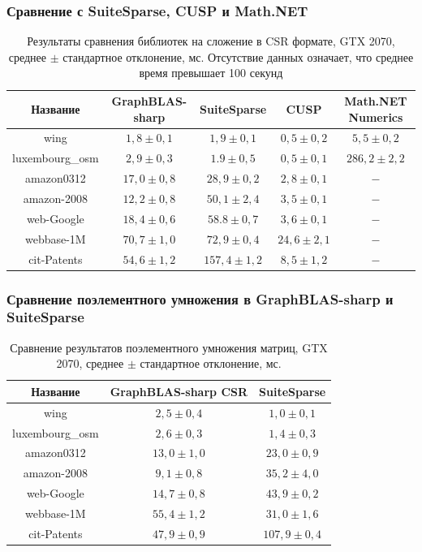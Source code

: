 \documentclass[aspectratio=169]{beamer}
\begin{document}
\begin{frame}
  \frametitle{Сравнение с SuiteSparse, CUSP и Math.NET}
\begin{table}
\centering
\begin{tabular}{|c||c|c|c|c|}
\hline
Название            & GraphBLAS-sharp & SuiteSparse & CUSP & Math.NET Numerics       \\
\hline
\hline
wing            & $1,8 \pm 0,1$      & $1,9\pm 0,1$   & $0,5\pm 0,2$ &  $5,5\pm 0,2$ \\
\hline
luxembourg\_osm & $2,9 \pm 0,3$      & $1.9\pm 0,5$   & $0,5\pm 0,1$  & $286,2\pm 2,2$ \\
\hline
amazon0312      & $17,0 \pm 0,8$      & $28,9\pm 0,2$  & $2,8\pm 0,1$  & $-$\\
\hline
amazon-2008     & $12,2 \pm 0,8$     & $50,1\pm 2,4$  & $3,5\pm 0,1$  & $-$\\
\hline
web-Google      & $18,4 \pm 0,6$     & $58.8\pm 0,7$  & $3,6\pm 0,1$  & $-$\\
\hline
webbase-1M      & $70,7 \pm 1,0$      & $72,9\pm 0,4$  & $24,6\pm 2,1$ & $-$\\
\hline
cit-Patents     & $54,6 \pm 1,2$      & $157,4\pm 1,2$ & $8,5\pm 1,2$  & $-$\\     
\hline
\end{tabular}
\caption{Результаты сравнения библиотек на сложение в CSR формате, GTX 2070, среднее $\pm$ стандартное отклонение, мс. Отсутствие данных означает, что среднее время превышает 100 секунд}
\label{platform-comparison}
\end{table}

\end{frame}

\begin{frame}
  \frametitle{Сравнение поэлементного умножения в GraphBLAS-sharp и SuiteSparse}
\begin{table}
\centering
\begin{tabular}{|c||c|c|}
\hline
Название            & GraphBLAS-sharp CSR & SuiteSparse    \\
\hline
\hline
wing            & $2,5 \pm 0,4$      & $1,0 \pm 0,1$ \\
\hline
luxembourg\_osm & $2,6 \pm 0,3$       & $1,4 \pm 0,3$ \\
\hline
amazon0312      & $13,0 \pm 1,0$     & $23,0 \pm 0,9$ \\
\hline
amazon-2008     & $9,1 \pm 0,8$    & $35,2 \pm 4,0$ \\
\hline
web-Google      & $14,7 \pm 0,8$      & $43,9 \pm 0,2$  \\
\hline
webbase-1M      & $55,4 \pm 1,2$      & $31,0 \pm 1,6$ \\
\hline
cit-Patents     & $47,9 \pm 0,9$      & $107,9 \pm 0,4$  \\     
\hline
\end{tabular}
\caption{Сравнение результатов поэлементного умножения матриц, GTX 2070, среднее $\pm$ стандартное отклонение, мс.}
\label{mult-comparison}
\end{table}

\end{frame}
\end{document}
